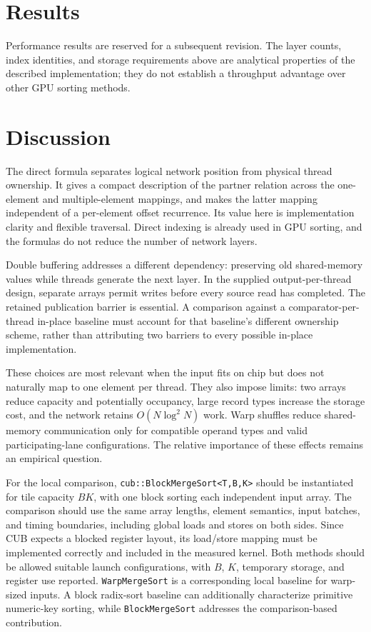 \documentclass[fleqn,10pt,lineno]{wlpeerj}
\begin{document}
\section*{Results}
\label{sec:results}
Performance results are reserved for a subsequent revision. The layer counts, index identities, and storage requirements above are analytical properties of the described implementation; they do not establish a throughput advantage over other GPU sorting methods.

\section*{Discussion}
\label{sec:discussion}
The direct formula separates logical network position from physical thread ownership. It gives a compact description of the partner relation across the one-element and multiple-element mappings, and makes the latter mapping independent of a per-element offset recurrence. Its value here is implementation clarity and flexible traversal. Direct indexing is already used in GPU sorting, and the formulas do not reduce the number of network layers.

Double buffering addresses a different dependency: preserving old shared-memory values while threads generate the next layer. In the supplied output-per-thread design, separate arrays permit writes before every source read has completed. The retained publication barrier is essential. A comparison against a comparator-per-thread in-place baseline must account for that baseline's different ownership scheme, rather than attributing two barriers to every possible in-place implementation.

These choices are most relevant when the input fits on chip but does not naturally map to one element per thread. They also impose limits: two arrays reduce capacity and potentially occupancy, large record types increase the storage cost, and the network retains $O(N\log^2N)$ work. Warp shuffles reduce shared-memory communication only for compatible operand types and valid participating-lane configurations. The relative importance of these effects remains an empirical question.

For the local comparison, \texttt{cub::BlockMergeSort<T,B,K>} should be instantiated for tile capacity $BK$, with one block sorting each independent input array. The comparison should use the same array lengths, element semantics, input batches, and timing boundaries, including global loads and stores on both sides. Since CUB expects a blocked register layout, its load/store mapping must be implemented correctly and included in the measured kernel. Both methods should be allowed suitable launch configurations, with $B$, $K$, temporary storage, and register use reported. \texttt{WarpMergeSort} is a corresponding local baseline for warp-sized inputs. A block radix-sort baseline can additionally characterize primitive numeric-key sorting, while \texttt{BlockMergeSort} addresses the comparison-based contribution.
\end{document}
